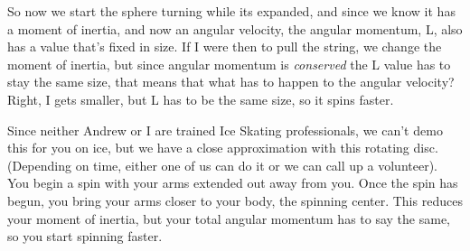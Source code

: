 \documentclass[12pt]{article}
\begin{document}
So now we start the sphere turning while its expanded, and since we know it has a moment of 
inertia, and now an angular velocity, the angular momentum, L, also has a value that's 
fixed in size. If I were then to pull the string, we change the moment of inertia, but since 
angular momentum is \emph{conserved} the L value has to stay the same size, that means that
what has to happen to the angular velocity? Right, I gets smaller, but L has to be the same
size, so it spins faster.

Since neither Andrew or I are trained Ice Skating professionals, we can't demo this for you 
on ice, but we have a close approximation with this rotating disc. (Depending on time, 
either one of us can do it or we can call up a volunteer). You begin a spin with your arms
extended out away from you. Once the spin has begun, you bring your arms closer 
to your body, the spinning center. This reduces your moment of inertia, but your total
angular momentum has to say the same, so you start spinning faster.
\end{document}
